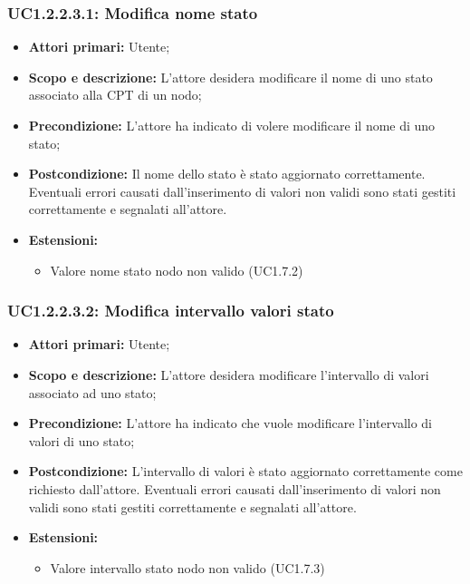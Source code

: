 \subsubsection{UC1.2.2.3.1: Modifica nome stato} 
\begin{itemize} 
	\item{\textbf{Attori primari:} Utente;} 
	\item{\textbf{Scopo e descrizione:} L'attore desidera modificare il nome di uno stato associato alla CPT di un nodo;} 
	\item{\textbf{Precondizione:} L'attore ha indicato di volere modificare il nome di uno stato;} 
	\item{\textbf{Postcondizione:} Il nome dello stato è stato aggiornato correttamente. Eventuali errori causati dall'inserimento di valori non validi sono stati gestiti correttamente e segnalati all'attore.}
	\item{\textbf{Estensioni:}
		\begin{itemize}
			\item{Valore nome stato nodo non valido (UC1.7.2)}
		\end{itemize}
	}
\end{itemize} 
\subsubsection{UC1.2.2.3.2: Modifica intervallo valori stato} 
\begin{itemize} 
	\item{\textbf{Attori primari:} Utente;} 
	\item{\textbf{Scopo e descrizione:} L'attore desidera modificare l'intervallo di valori associato ad uno stato;} 
	\item{\textbf{Precondizione:} L'attore ha indicato che vuole modificare l'intervallo di valori di uno stato;} 
	\item{\textbf{Postcondizione:} L'intervallo di valori è stato aggiornato correttamente come richiesto dall'attore. Eventuali errori causati dall'inserimento di valori non validi sono stati gestiti correttamente e segnalati all'attore.}
	\item{\textbf{Estensioni:}
		\begin{itemize}
			\item{Valore intervallo stato nodo non valido (UC1.7.3)}
		\end{itemize}
	}
\end{itemize} 
